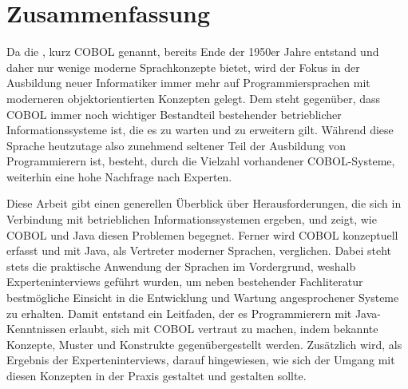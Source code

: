 \chapter*{Zusammenfassung} 

Da die , kurz \mbox{COBOL} genannt, bereits Ende der 1950er Jahre entstand und daher nur wenige moderne Sprachkonzepte bietet, wird der Fokus in der Ausbildung neuer Informatiker immer mehr auf Programmiersprachen mit moderneren objektorientierten Konzepten gelegt. Dem steht gegenüber, dass COBOL immer noch wichtiger Bestandteil bestehender betrieblicher Informationssysteme ist, die es zu warten und zu erweitern gilt. Während diese Sprache heutzutage also zunehmend seltener Teil der Ausbildung von Programmierern ist, besteht, durch die Vielzahl vorhandener COBOL-Systeme, weiterhin eine hohe Nachfrage nach Experten.

Diese Arbeit gibt einen generellen Überblick über Herausforderungen, die sich in Verbindung mit betrieblichen Informationssystemen ergeben, und zeigt, wie COBOL und Java diesen Problemen begegnet. Ferner wird COBOL konzeptuell erfasst und mit Java, als Vertreter moderner Sprachen, verglichen. Dabei steht stets die praktische Anwendung der Sprachen im Vordergrund, weshalb Experteninterviews geführt wurden, um neben bestehender Fachliteratur bestmögliche Einsicht in die Entwicklung und Wartung angesprochener Systeme zu erhalten. Damit entstand ein Leitfaden, der es Programmierern mit Java-Kenntnissen erlaubt, sich mit COBOL vertraut zu machen, indem bekannte Konzepte, Muster und Konstrukte gegenübergestellt werden. Zusätzlich wird, als Ergebnis der Experteninterviews, darauf hingewiesen, wie sich der Umgang mit diesen Konzepten in der Praxis gestaltet und gestalten sollte. 